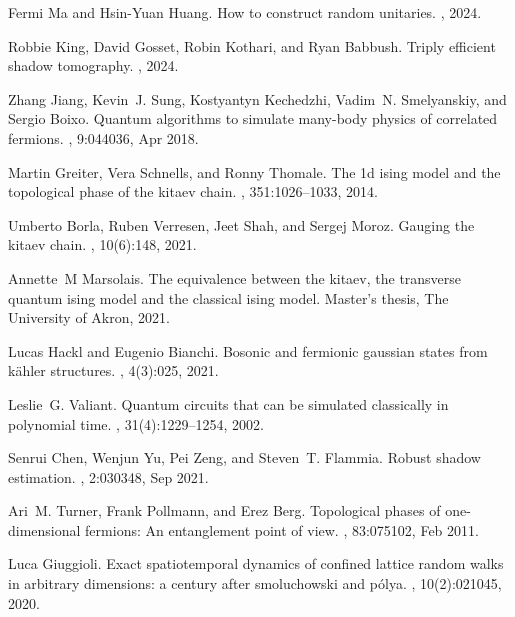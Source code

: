 \documentclass[showpacs,twocolumn,aps,prx,long bibliography,superscriptaddress,notitlepage]{revtex4-1}
\begin{document}
\begin{thebibliography}{10}
Fermi Ma and Hsin-Yuan Huang.
\newblock How to construct random unitaries.
, 2024.

Robbie King, David Gosset, Robin Kothari, and Ryan Babbush.
\newblock Triply efficient shadow tomography.
, 2024.

Zhang Jiang, Kevin~J. Sung, Kostyantyn Kechedzhi, Vadim~N. Smelyanskiy, and
  Sergio Boixo.
\newblock Quantum algorithms to simulate many-body physics of correlated
  fermions.
, 9:044036, Apr 2018.

Martin Greiter, Vera Schnells, and Ronny Thomale.
\newblock The 1d ising model and the topological phase of the kitaev chain.
, 351:1026--1033, 2014.

Umberto Borla, Ruben Verresen, Jeet Shah, and Sergej Moroz.
\newblock Gauging the kitaev chain.
, 10(6):148, 2021.

Annette~M Marsolais.
\newblock The equivalence between the kitaev, the transverse quantum ising
  model and the classical ising model.
\newblock Master's thesis, The University of Akron, 2021.

Lucas Hackl and Eugenio Bianchi.
\newblock Bosonic and fermionic gaussian states from k{\"a}hler structures.
, 4(3):025, 2021.

Leslie~G. Valiant.
\newblock Quantum circuits that can be simulated classically in polynomial
  time.
, 31(4):1229--1254, 2002.

Senrui Chen, Wenjun Yu, Pei Zeng, and Steven~T. Flammia.
\newblock Robust shadow estimation.
, 2:030348, Sep 2021.

Ari~M. Turner, Frank Pollmann, and Erez Berg.
\newblock Topological phases of one-dimensional fermions: An entanglement point
  of view.
, 83:075102, Feb 2011.

Luca Giuggioli.
\newblock Exact spatiotemporal dynamics of confined lattice random walks in
  arbitrary dimensions: a century after smoluchowski and p{\'o}lya.
, 10(2):021045, 2020.


\end{thebibliography}
\end{document}
